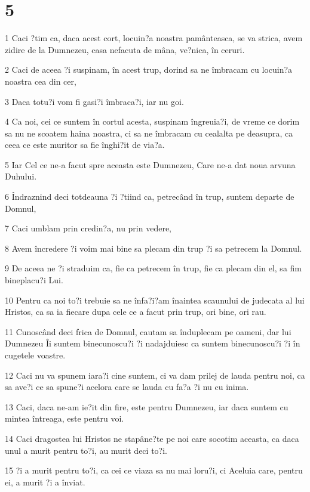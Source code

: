 \chapter{5}

\par 1 Caci ?tim ca, daca acest cort, locuin?a noastra pamânteasca, se va strica, avem zidire de la Dumnezeu, casa nefacuta de mâna, ve?nica, în ceruri.
\par 2 Caci de aceea ?i suspinam, în acest trup, dorind sa ne îmbracam cu locuin?a noastra cea din cer,
\par 3 Daca totu?i vom fi gasi?i îmbraca?i, iar nu goi.
\par 4 Ca noi, cei ce suntem în cortul acesta, suspinam îngreuia?i, de vreme ce dorim sa nu ne scoatem haina noastra, ci sa ne îmbracam cu cealalta pe deasupra, ca ceea ce este muritor sa fie înghi?it de via?a.
\par 5 Iar Cel ce ne-a facut spre aceasta este Dumnezeu, Care ne-a dat noua arvuna Duhului.
\par 6 Îndraznind deci totdeauna ?i ?tiind ca, petrecând în trup, suntem departe de Domnul,
\par 7 Caci umblam prin credin?a, nu prin vedere,
\par 8 Avem încredere ?i voim mai bine sa plecam din trup ?i sa petrecem la Domnul.
\par 9 De aceea ne ?i straduim ca, fie ca petrecem în trup, fie ca plecam din el, sa fim bineplacu?i Lui.
\par 10 Pentru ca noi to?i trebuie sa ne înfa?i?am înaintea scaunului de judecata al lui Hristos, ca sa ia fiecare dupa cele ce a facut prin trup, ori bine, ori rau.
\par 11 Cunoscând deci frica de Domnul, cautam sa înduplecam pe oameni, dar lui Dumnezeu Îi suntem binecunoscu?i ?i nadajduiesc ca suntem binecunoscu?i ?i în cugetele voastre.
\par 12 Caci nu va spunem iara?i cine suntem, ci va dam prilej de lauda pentru noi, ca sa ave?i ce sa spune?i acelora care se lauda cu fa?a ?i nu cu inima.
\par 13 Caci, daca ne-am ie?it din fire, este pentru Dumnezeu, iar daca suntem cu mintea întreaga, este pentru voi.
\par 14 Caci dragostea lui Hristos ne stapâne?te pe noi care socotim aceasta, ca daca unul a murit pentru to?i, au murit deci to?i.
\par 15 ?i a murit pentru to?i, ca cei ce viaza sa nu mai loru?i, ci Aceluia care, pentru ei, a murit ?i a înviat.
